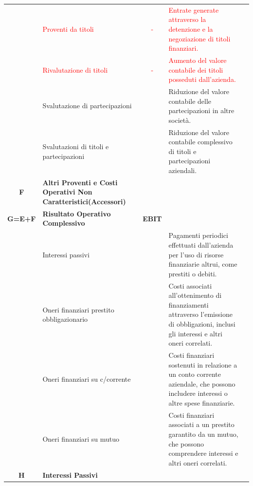 \documentclass{article}
\newcommand{\ProventiDaTitoli}{Entrate generate attraverso la detenzione e la negoziazione di titoli finanziari.}
\newcommand{\RivalutazioneDiTitoli}{Aumento del valore contabile dei titoli posseduti dall'azienda.}
\newcommand{\SvalutazioneDiPartecipazioni}{Riduzione del valore contabile delle partecipazioni in altre società.}
\newcommand{\SvalutazioniDiTitoliEPartecipazioni}{Riduzione del valore contabile complessivo di titoli e partecipazioni aziendali.}
\newcommand{\InteressiPassivi}{Pagamenti periodici effettuati dall'azienda per l'uso di risorse finanziarie altrui, come prestiti o debiti.}
\newcommand{\OneriFinanziariObbligazionario}{Costi associati all'ottenimento di finanziamenti attraverso l'emissione di obbligazioni, inclusi gli interessi e altri oneri correlati.}
\newcommand{\OneriFinanziariCCorrente}{Costi finanziari sostenuti in relazione a un conto corrente aziendale, che possono includere interessi o altre spese finanziarie.}
\newcommand{\OneriFinanziariMutuo}{Costi finanziari associati a un prestito garantito da un mutuo, che possono comprendere interessi e altri oneri correlati.}
\begin{document}
\begin{table}[ht]
{\begin{tabular}{|c l|c|l|c|}
                           & \textcolor{red}{Proventi da titoli}                                     & \textcolor{red}{-} & \textcolor{red}{\ProventiDaTitoli}                          &           \\
                           & \textcolor{red}{Rivalutazione di titoli}                                & \textcolor{red}{-} & \textcolor{red}{\RivalutazioneDiTitoli}                     &           \\
                           & Svalutazione di partecipazioni                                          &                    & \SvalutazioneDiPartecipazioni                               &           \\
                           & Svalutazioni di titoli e partecipazioni                                 &                    & \SvalutazioniDiTitoliEPartecipazioni                        &           \\
            \textbf{F}     & \textbf{Altri Proventi e Costi Operativi Non Caratteristici(Accessori)} &                    &                                                             &           \\
            \hline
            \textbf{G=E+F} & \textbf{Risultato Operativo Complessivo}                                & \textbf{EBIT}      &                                                             &           \\
            \hline
                           & Interessi passivi                                                       &                    & \InteressiPassivi                                           &           \\
                           & Oneri finanziari prestito obbligazionario                               &                    & \OneriFinanziariObbligazionario                             &           \\
                           & Oneri finanziari su c/corrente                                          &                    & \OneriFinanziariCCorrente                                   &           \\
                           & Oneri finanziari su mutuo                                               &                    & \OneriFinanziariMutuo                                       &           \\
            \textbf{H}     & \textbf{Interessi Passivi}                                              &                    &                                                             &           \\

\end{tabular}}
\end{table}
\end{document}
